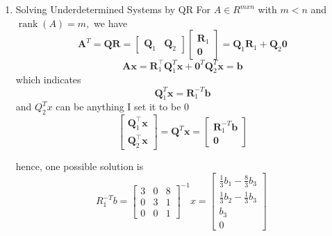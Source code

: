\documentclass[english,onecolumn]{IEEEtran}
\begin{document}
\begin{enumerate}
\item 
Solving Underdetermined Systems by QR For $A \in R^{m x n}$ with $m<n$ and $\operatorname{rank}(A)=m,$ we have
$$
\mathbf{A}^{T}=\mathbf{Q R}=\left[\begin{array}{ll}
	\mathbf{Q}_{1} & \mathbf{Q}_{2}
\end{array}\right]\left[\begin{array}{c}
	\mathbf{R}_{1} \\
	\mathbf{0}
\end{array}\right]=\mathbf{Q}_{1} \mathbf{R}_{1}+\mathbf{Q}_{2} \mathbf{0}
$$
$$
\mathbf{A} \mathbf{x}=\mathbf{R}_{1}^{\top} \mathbf{Q}_{1}^{T} \mathbf{x}+\mathbf{0}^{T} \mathbf{Q}_{2}^{T} \mathbf{x}=\mathbf{b}
$$
which indicates
$$
\mathbf{Q}_{1}^{T} \mathbf{x}=\mathbf{R}_{1}^{-T} \mathbf{b}
$$
and $Q_{2}^{T} x$ can be anything I set it to be 0 
$$
\left[\begin{array}{l}
	\mathbf{Q}_{1}^{\top} \mathbf{x} \\
	\mathbf{Q}_{2}^{\top} \mathbf{x}
\end{array}\right]=\mathbf{Q}^{T} \mathbf{x}=\left[\begin{array}{c}
	\mathbf{R}_{1}^{-T} \mathbf{b} \\
	\mathbf{0}
\end{array}\right]
$$


hence, one possible solution is
$$
R_{1}^{-T} b = 
\begin{bmatrix}
	3&0&8\\
	0&3&1\\
	0&0&1
\end{bmatrix}^{-1} x=
\begin{bmatrix}
	\frac{1}{3}b_1-\frac{8}{3}b_3\\
	\frac{1}{3}b_2-\frac{1}{3}b_3\\
	b_3\\
	0
\end{bmatrix}\
$$


\end{enumerate}
\end{document}
